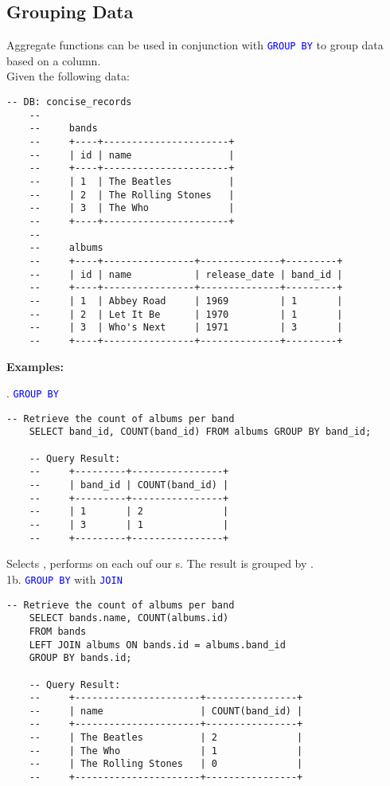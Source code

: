 \subsection{Grouping Data}

\noindent
Aggregate functions can be used in conjunction with \textcolor{blue}{\texttt{GROUP BY}} to group data based on a column.\\

\noindent
Given the following data:
\begin{lstlisting}[style=sql]
    -- DB: concise_records
    --
    --     bands
    --     +----+----------------------+
    --     | id | name                 |
    --     +----+----------------------+
    --     | 1  | The Beatles          |
    --     | 2  | The Rolling Stones   |
    --     | 3  | The Who              |
    --     +----+----------------------+
    --    
    --     albums
    --     +----+----------------+--------------+---------+
    --     | id | name           | release_date | band_id |
    --     +----+----------------+--------------+---------+
    --     | 1  | Abbey Road     | 1969         | 1       |
    --     | 2  | Let It Be      | 1970         | 1       |
    --     | 3  | Who's Next     | 1971         | 3       |
    --     +----+----------------+--------------+---------+
\end{lstlisting}

\noindent
\textbf{Examples:}

\vspace{.5em}
. \textcolor{blue}{\texttt{GROUP BY}}
\begin{lstlisting}[style=sql]
    -- Retrieve the count of albums per band
    SELECT band_id, COUNT(band_id) FROM albums GROUP BY band_id;
    
    -- Query Result:
    --     +---------+----------------+
    --     | band_id | COUNT(band_id) |
    --     +---------+----------------+
    --     | 1       | 2              |
    --     | 3       | 1              |
    --     +---------+----------------+
\end{lstlisting}

\noindent
Selects , performs  on each ouf our s.
The result is grouped by .\\

\noindent
1b. \textcolor{blue}{\texttt{GROUP BY}} with \textcolor{blue}{\texttt{JOIN}}
\begin{lstlisting}[style=sql]
    -- Retrieve the count of albums per band
    SELECT bands.name, COUNT(albums.id)
    FROM bands
    LEFT JOIN albums ON bands.id = albums.band_id
    GROUP BY bands.id;

    -- Query Result:
    --     +----------------------+----------------+
    --     | name                 | COUNT(band_id) |
    --     +----------------------+----------------+
    --     | The Beatles          | 2              |
    --     | The Who              | 1              |
    --     | The Rolling Stones   | 0              |
    --     +----------------------+----------------+
\end{lstlisting}

